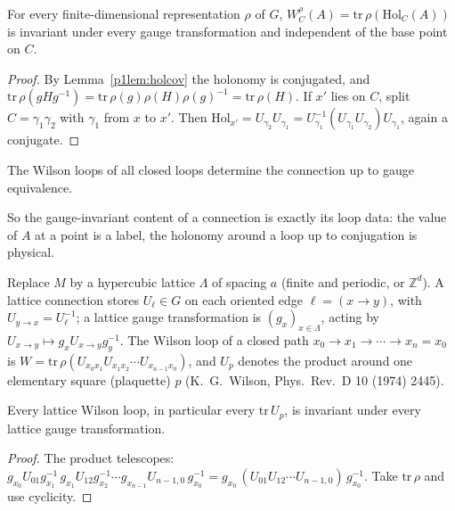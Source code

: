 \begin{theorem}\label{p1thm:wilson}
 For every finite-dimensional representation $\rho$ of $G$, $W_C^\rho(A)=\mathrm{tr}\,\rho(\mathrm{Hol}_C(A))$
is invariant under every gauge transformation and independent of the base point on $C$.
\end{theorem}
\begin{proof}
By Lemma~\ref{p1lem:holcov} the holonomy is conjugated, and $\mathrm{tr}\,\rho(gHg^{-1})=\mathrm{tr}\,\rho(g)\rho(H)\rho(g)^{-1}=\mathrm{tr}\,\rho(H)$.
If $x'$ lies on $C$, split $C=\gamma_1\gamma_2$ with $\gamma_1$ from $x$ to $x'$. Then
$\mathrm{Hol}_{x'}=U_{\gamma_2}U_{\gamma_1}=U_{\gamma_1}^{-1}(U_{\gamma_1}U_{\gamma_2})U_{\gamma_1}$, again a conjugate.
\end{proof}

\begin{theorem}[Giles]\label{p1thm:giles}
 The Wilson loops of all closed loops determine the
connection up to gauge equivalence.
\end{theorem}
\noindent So the gauge-invariant content of a connection is exactly its loop data: the value of $A$ at a point is a
label, the holonomy around a loop up to conjugation is physical.

\begin{definition}
Replace $M$ by a hypercubic lattice $\Lambda$ of spacing $a$ (finite and periodic, or $\mathbb{Z}^d$). A lattice
connection stores $U_\ell\in G$ on each oriented edge $\ell=(x\to y)$, with $U_{y\to x}=U_\ell^{-1}$; a lattice gauge
transformation is $(g_x)_{x\in\Lambda}$, acting by $U_{x\to y}\mapsto g_xU_{x\to y}g_y^{-1}$. The Wilson loop of a
closed path $x_0\to x_1\to\cdots\to x_n=x_0$ is $W=\mathrm{tr}\,\rho(U_{x_0x_1}U_{x_1x_2}\cdots U_{x_{n-1}x_0})$, and
$U_p$ denotes the product around one elementary square (plaquette) $p$ (K.~G.~Wilson, Phys.\ Rev.\ D 10 (1974) 2445).
\end{definition}

\begin{theorem}\label{p1thm:latgauge}
 Every lattice Wilson loop, in particular every $\mathrm{tr}\,U_p$, is invariant under every lattice
gauge transformation.
\end{theorem}
\begin{proof}
The product telescopes:
$g_{x_0}U_{01}g_{x_1}^{-1}\,g_{x_1}U_{12}g_{x_2}^{-1}\cdots g_{x_{n-1}}U_{n-1,0}\,g_{x_0}^{-1}
=g_{x_0}\,(U_{01}U_{12}\cdots U_{n-1,0})\,g_{x_0}^{-1}$. Take $\mathrm{tr}\,\rho$ and use cyclicity.
\end{proof}

